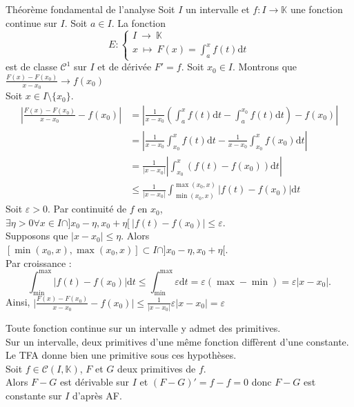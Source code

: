 \documentclass[11pt]{article}
\newcommand*{\K}{\mathbb{K}}
\newcommand*{\m}{\mathcal}
\newcommand{\0}{\varnothing}
\newcommand*{\e}{\varepsilon}
\newcommand{\dt}{\textrm{d}t}
\begin{document}
\begin{thm}{Théorème fondamental de l'analyse}{}
    Soit $I$ un intervalle et $f:I\to\K$ une fonction continue sur $I$. Soit $a\in I$. La fonction
    \begin{equation*}
        E: \begin{cases}
           I~\to~\K\\
           x~\mapsto~F(x) = \int_a^xf(t)\dt 
        \end{cases}
    \end{equation*}
    est de classe $\m{C}^1$ sur $I$ et de dérivée $F'=f$.
    \tcblower
    Soit $x_0\in I$. Montrons que $\frac{F(x)-F(x_0)}{x-x_0}\to f(x_0)$\\
    Soit $x\in I\setminus\{x_0\}$.
    \begin{align*}
        \left|\frac{F(x)-F(x_0)}{x-x_0}-f(x_0)\right|&=\left|\frac{1}{x-x_0}\left(\int_a^xf(t)\dt-\int_a^{x_0}f(t)\dt\right)-f(x_0)\right|\\
        &=\left|\frac{1}{x-x_0}\int_{x_0}^xf(t)\dt-\frac{1}{x-x_0}\int_{x_0}^xf(x_0)\dt\right|\\
        &=\frac{1}{|x-x_0|}\left|\int_{x_0}^x(f(t)-f(x_0))\dt\right|\\
        &\leq\frac{1}{|x-x_0|}\int_{\min(x_0,x)}^{\max(x_0,x)}\left|f(t)-f(x_0)\right|\dt
    \end{align*}
    Soit $\e>0$. Par continuité de $f$ en $x_0$, $\exists \eta>0 \forall x \in I\cap]x_0-\eta,x_0+\eta[~|f(t)-f(x_0)|\leq\e$.\\
    Supposons que $|x-x_0|\leq\eta$. Alors $[\min(x_0,x), \max(x_0,x)]\subset I\cap]x_0-\eta,x_0+\eta[$.\\
    Par croissance :
    \begin{equation*}
        \int_{\min}^{\max}\Big|f(t)-f(x_0)\Big|\dt\leq\int_{\min}^{\max}\e\dt = \e(\max - \min) = \e|x-x_0|.
    \end{equation*}
    Ainsi, $\Big|\frac{F(x)-F(x_0)}{x-x_0}-f(x_0)\Big|\leq\frac{1}{|x-x_0|}\e|x-x_0|=\e$
\end{thm}

\begin{corr}{}{}
    Toute fonction continue sur un intervalle y admet des primitives.\\
    Sur un intervalle, deux primitives d'une même fonction diffèrent d'une constante.
    \tcblower
    Le TFA donne bien une primitive sous ces hypothèses.\\
    Soit $f\in\m{C}(I,\K)$, $F$ et $G$ deux primitives de $f$.\\
    Alors $F-G$ est dérivable sur $I$ et $(F-G)'=f-f=0$ donc $F-G$ est constante sur $I$ d'après AF.
\end{corr}
\end{document}
